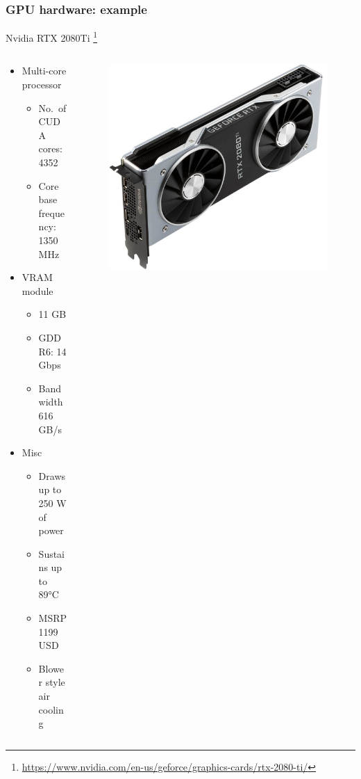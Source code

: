 \documentclass[10pt, aspectratio=1610]{beamer}
\begin{document}
\begin{frame}
  \frametitle{GPU hardware: example}

  Nvidia RTX 2080Ti%
    \footnote{
      \url{https://www.nvidia.com/en-us/geforce/graphics-cards/rtx-2080-ti/}
    }

  \begin{columns}
    \begin{column}{0.6\textwidth}
      \begin{itemize}
        \item Multi-core processor
          \begin{itemize}
            \item No.~of CUDA cores: 4352
            \item Core base frequency: 1350 MHz
          \end{itemize}
        \item VRAM module
          \begin{itemize}
            \item 11 GB
            \item GDDR6: 14 Gbps
            \item Bandwidth 616 GB/s
          \end{itemize}
        \item Misc
          \begin{itemize}
            \item Draws up to 250 W of power
            \item Sustains up to 89°C
            \item MSRP 1199 USD
            \item Blower style air cooling
          \end{itemize}
      \end{itemize}
    \end{column}
    \begin{column}{0.35\textwidth}
      \begin{figure}
        \centering
        \includegraphics[width=\textwidth]{./img/nvidia-rtx-2080-ti.jpg}

\end{figure}
\end{column}
\end{columns}
\end{frame}
\end{document}
